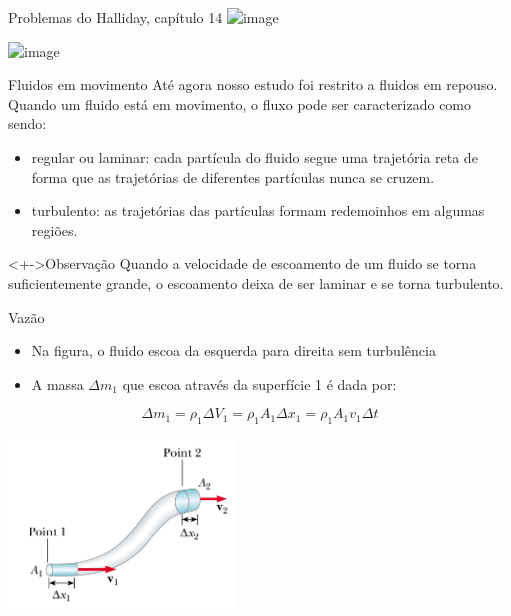 \documentclass[t,%
brazilian,%
11pt,%
aspectratio=169,%
table%
]{beamer}
\begin{document}
\begin{frame}{Problemas do Halliday, capítulo 14}
    \centering
    \includegraphics<+>[height=\textheight-28pt]{images/Captura de tela de 2024-01-23 12-13-05.png}

    \includegraphics<+>[width=\textwidth]{images/Captura de tela de 2024-01-23 12-23-46.png}
\end{frame}

\begin{frame}{Fluidos em movimento}
    Até agora nosso estudo foi restrito a fluidos em repouso. Quando um fluido está
    em movimento, o fluxo pode ser caracterizado como sendo:

    \begin{itemize}
        \item regular ou laminar: cada partícula do fluido segue uma trajetória reta de
            forma que as trajetórias de diferentes partículas nunca se cruzem.

        \item turbulento: as trajetórias das partículas formam redemoinhos em algumas
            regiões.
    \end{itemize}
    \centering

    \begin{block}<+->{Observação}
    Quando a velocidade de escoamento de um fluido se torna suficientemente grande,
    o escoamento deixa de ser laminar e se torna turbulento.
    \end{block}
\end{frame}

\begin{frame}{Vazão}
    \begin{itemize}
        \item Na figura, o fluido escoa da esquerda para direita sem turbulência
        \item A massa $\Delta m_1$ que escoa através da superfície 1 é dada por:
    \end{itemize}
    \[
        \Delta m_1 = \rho_1 \Delta V_1 = \rho_1 A_1 \Delta x_1 = \rho_1 A_1 v_1 \Delta t
    \]
    \begin{center}
        \includegraphics[width=0.45\textwidth]{images/tuboS}
    \end{center}
\end{frame}
\end{document}
